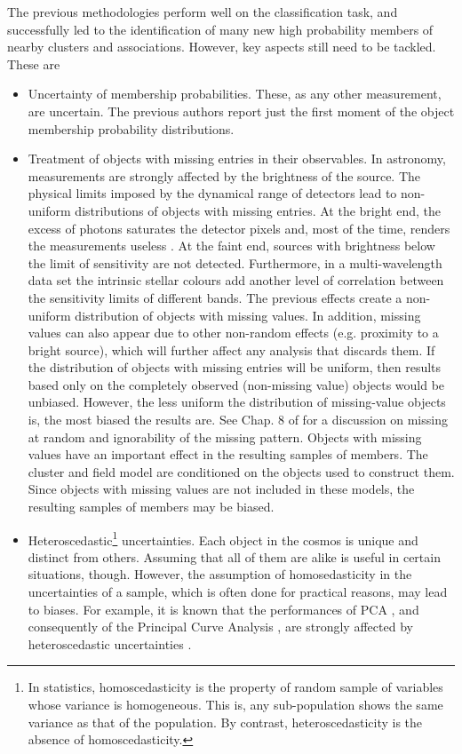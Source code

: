 The previous methodologies perform well on the classification task, and successfully led to the identification of many new high probability members of nearby clusters and associations. However, key aspects still need to be tackled. These are 
\begin{itemize}
\item Uncertainty of membership probabilities. These, as any other measurement, are uncertain. The previous authors report just the first moment of the object membership probability distributions.
\item Treatment of objects with missing entries in their observables. In astronomy, measurements are strongly affected by the brightness of the source. The physical limits imposed by the dynamical range of detectors lead to non-uniform distributions of objects with missing entries. At the bright end, the excess of photons saturates the detector pixels and, most of the time, renders the measurements useless \cite[however, see][ for examples of high-precision astrometry and photometry on saturated images]{2003hstc.conf..346M,2013AJ....146..106O}.  At the faint end, sources with brightness below the limit of sensitivity are not detected. Furthermore, in a multi-wavelength data set the intrinsic stellar colours add another level of correlation between the sensitivity limits of different bands. The previous effects create a non-uniform distribution of objects with missing values. In addition, missing values can also appear due to other non-random effects (e.g. proximity to a bright source), which will further affect any analysis that discards them. If the distribution of objects with missing entries will be uniform, then results based only on the completely observed (non-missing value) objects would be unbiased. However, the less uniform the distribution of missing-value objects is, the most biased the results are. See Chap. 8 of \citet{Gelman2013} for a discussion on missing at random and ignorability of the missing pattern. Objects with missing values have an important effect in the resulting samples of members. The cluster and field model are conditioned on the objects used to construct them. Since objects with missing values are not included in these models, the resulting samples of members may be biased.
\item Heteroscedastic\footnote{In statistics, homoscedasticity is the property of random sample of variables whose variance is homogeneous. This is, any sub-population shows the same variance as that of the population. By contrast, heteroscedasticity is the absence of homoscedasticity.} uncertainties. Each object in the cosmos is unique and distinct from others. Assuming that all of them are alike is useful in certain situations, though. However, the assumption of homosedasticity in the uncertainties of a sample, which is often done for practical reasons, may lead to biases. For example, it is known that the performances of PCA \cite[used by][]{KroneMartins2014}, and consequently of the Principal Curve Analysis \cite[used by][]{Sarro2014}, are strongly affected by heteroscedastic uncertainties \citep{Hong2016}. 

\end{itemize}
